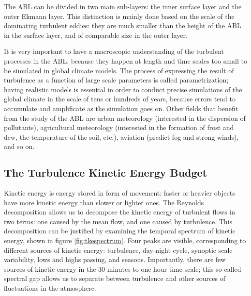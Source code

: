 \documentclass[a4paper,11pt]{kth-mag}
\begin{document}
The ABL can be divided in two main sub-layers: the inner surface layer and the outer Ekmann layer. This distinction is mainly done based on the scale of the dominating turbulent eddies: they are much smaller than the height of the ABL in the surface layer, and of comparable size in the outer layer.

It is very important to have a macroscopic understanding of the turbulent processes in the ABL, because they happen at length and time scales too small to be simulated in global climate models. The process of expressing the result of turbulence as a function of large scale parameters is called parametrization; having realistic models is essential in order to conduct precise simulations of the global climate in the scale of tens or hundreds of years, because errors tend to accumulate and amplificate as the simulation goes on. Other fields that benefit from the study of the ABL are urban meteorology (interested in the dispersion of pollutants), agricultural meteorology (interested in the formation of frost and dew, the temperature of the soil, etc.), aviation (predict fog and strong winds), and so on.

\subsection{The Turbulence Kinetic Energy Budget}
\label{sec:tke}
Kinetic energy is energy stored in form of movement: faster or heavier objects have more kinetic energy than slower or lighter ones. The Reynolds decomposition allows us to decompose the kinetic energy of turbulent flows in two terms: one caused by the mean flow, and one caused by turbulence. This decomposition can be justified by examining the temporal spectrum of kinetic energy, shown in figure \ref{fig:tkespectrum}. Four peaks are visible, corresponding to different sources of kinetic energy: turbulence, day-night cycle, synoptic scale variability, lows and highs passing, and seasons. Importantly, there are few sources of kinetic energy in the 30 minutes to one hour time scale; this so-called spectral gap allows us to separate between turbulence and other sources of fluctuations in the atmosphere.
\end{document}

